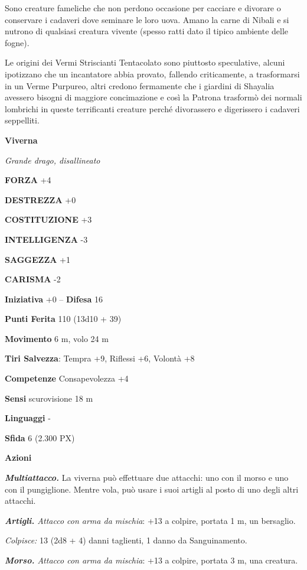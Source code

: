 \begin{multicols}{2}
	Sono creature fameliche che non perdono occasione per cacciare e divorare o conservare i cadaveri dove seminare le loro uova. Amano la carne di Nibali e si nutrono di qualsiasi creatura vivente (spesso ratti dato il tipico ambiente delle fogne).

	Le origini dei Vermi Striscianti Tentacolato sono piuttosto speculative, alcuni ipotizzano che un incantatore abbia provato, fallendo criticamente, a trasformarsi in un Verme Purpureo, altri credono fermamente che i giardini di Shayalia avessero bisogni di maggiore concimazione e così la Patrona trasformò dei normali lombrichi in queste terrificanti creature perché divorassero e digerissero i cadaveri seppelliti.

	\medskip{}\textbf{Viverna}

	\textit{Grande drago, disallineato}

	\textbf{FORZA} +4

	\textbf{DESTREZZA} +0

	\textbf{COSTITUZIONE} +3

	\textbf{INTELLIGENZA} -3

	\textbf{SAGGEZZA} +1

	\textbf{CARISMA} -2

	\textbf{Iniziativa} +0 -- \textbf{Difesa} 16

	\textbf{Punti Ferita} 110 (13d10 + 39)

	\textbf{Movimento} 6 m, volo 24 m

	\textbf{Tiri Salvezza}: Tempra +9, Riflessi +6, Volontà +8

	\textbf{Competenze} Consapevolezza +4

	\textbf{Sensi} scurovisione 18 m

	\textbf{Linguaggi} -

	\textbf{Sfida} 6 (2.300 PX)

	\textbf{Azioni}

	\textit{\textbf{Multiattacco.}} La viverna può effettuare due attacchi: uno con il morso e uno con il pungiglione. Mentre vola, può usare i suoi artigli al posto di uno degli altri attacchi.

	\textit{\textbf{Artigli.} Attacco con arma da mischia}: +13 a colpire, portata 1 m, un bersaglio.

	\textit{Colpisce:} 13 (2d8 + 4) danni taglienti, 1 danno da Sanguinamento.

	\textit{\textbf{Morso.} Attacco con arma da mischia}: +13 a colpire, portata 3 m, una creatura.


\end{multicols}
